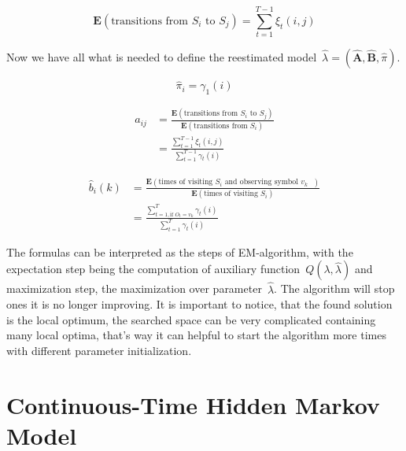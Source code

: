 \documentclass[thesis=M,english]{FITthesis}[2012/10/20]
\newcommand{\matr}[1]{\mathbf{#1}}
\begin{document}
\begin{equation}
\mathbf{E}(\text{transitions from $S_i$ to $S_j$}) = \sum_{t=1}^{T-1} \xi_t(i,j)  
\end{equation}

Now we have all what is needed to define the reestimated model~$\hat\lambda=(\hat{\matr{A}},\hat{\matr{B}},\hat\pi)$.

\begin{equation}\label{eq:bwpi}
\hat\pi_i = \gamma_1(i)  
\end{equation}

\begin{equation}\label{eq:bwa}
\begin{aligned}
\hat a_{ij} &= \frac{\mathbf{E}(\text{transitions from $S_i$ to $S_j$})}
				   {\mathbf{E}(\text{transitions from $S_i$})}  \\
		    &= \frac{\sum\limits_{t=1}^{T-1} \xi_t(i,j)}{\sum\limits_{t=1}^{T-1} \gamma_t(i) }
\end{aligned}
\end{equation}

\begin{equation}\label{eq:bwb}
\begin{aligned}
\hat b_{i}(k) &= \frac{\mathbf{E}(\text{times of visiting $S_i$ and observing symbol $v_k$ })}
				   {\mathbf{E}(\text{times of visiting $S_i$})} \\
			  &= \frac{\sum\limits_{t=1, \text{if } O_t = v_k  }^{T} \gamma_t(i)}{\sum\limits_{t=1}^{T} \gamma_t(i) } 
\end{aligned}
\end{equation}

The formulas can be interpreted as the steps of EM-algorithm, with the expectation step being the computation of auxiliary function~$Q(\lambda,\hat\lambda)$ and maximization step, the maximization over parameter~$\hat\lambda$. The algorithm will stop ones it is no longer improving. It is important to notice, that the found solution is the local optimum, the searched space can be very complicated containing many local optima, that's way it can helpful to start the algorithm more times with different parameter initialization.  


\chapter{Continuous-Time Hidden Markov Model}
\end{document}
